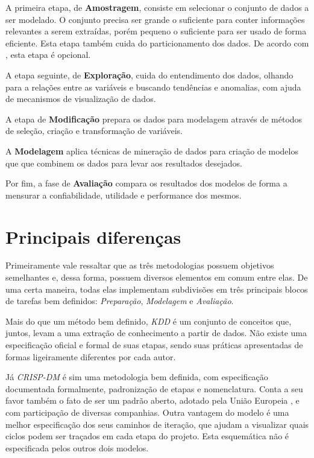 \documentclass[
	article,			%
	11pt,				%
	oneside,			%
	a4paper,			%
	english,			%
	brazil,				%
	sumario=tradicional
	]{abntex2}
\begin{document}
A primeira etapa, de \textbf{Amostragem}, consiste em selecionar o conjunto de
dados a ser modelado. O conjunto precisa ser grande o suficiente para conter
informações relevantes a serem extraídas, porém pequeno o suficiente para ser
usado de forma eficiente. Esta etapa também cuida do particionamento dos dados.
De acordo com , esta etapa é opcional.

A etapa seguinte, de \textbf{Exploração}, cuida do entendimento dos dados,
olhando para a relações entre as variáveis e buscando tendências e anomalias,
com ajuda de mecanismos de visualização de dados.

A etapa de \textbf{Modificação} prepara os dados para modelagem através de
métodos de seleção, criação e transformação de variáveis.

A \textbf{Modelagem} aplica técnicas de mineração de dados para criação de
modelos que que combinem os dados para levar aos resultados desejados.

Por fim, a fase de \textbf{Avaliação} compara os resultados dos modelos de forma
a mensurar a confiabilidade, utilidade e performance dos mesmos.


\section{Principais diferenças}
\label{sec:diferencas}

Primeiramente vale ressaltar que as três metodologias possuem objetivos
semelhantes e, dessa forma, possuem diversos elementos em comum entre elas. De
uma certa maneira, todas elas implementam subdivisões em três principais blocos
de tarefas bem definidos: \textit{Preparação}, \textit{Modelagem} e
\textit{Avaliação}.

Mais do que um método bem definido, \textit{KDD} é um conjunto de conceitos
que, juntos, levam a uma extração de conhecimento a partir de dados. Não existe
uma especificação oficial e formal de suas etapas, sendo suas práticas
apresentadas de formas ligeiramente diferentes por cada autor.

Já \textit{CRISP-DM} é sim uma metodologia bem definida, com especificação
documentada formalmente, padronização de etapas e nomenclatura. Conta a seu
favor também o fato de ser um padrão aberto, adotado pela União Europeia
\cite{wikipedia-crisp-2021}, e com participação de diversas companhias. Outra
vantagem do modelo é uma melhor especificação dos seus caminhos de iteração,
que ajudam a visualizar quais ciclos podem ser traçados em cada etapa do
projeto. Esta esquemática não é especificada pelos outros dois modelos.
\end{document}
